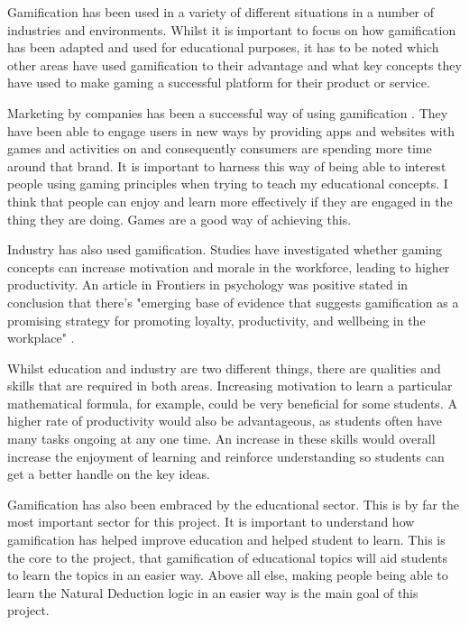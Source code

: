 \documentclass[a4paper]{article}
\begin{document}
Gamification has been used in a variety of different situations in a number of industries and environments. Whilst it is important to focus on how gamification has been adapted and used for educational purposes, it has to be noted which other areas have used gamification to their advantage and what key concepts they have used to make gaming a successful platform for their product or service.  

Marketing by companies has been a successful way of using gamification \cite{zichermann2011gamification}. They have been able to engage users in new ways by providing apps and websites with games and activities on and consequently consumers are spending more time around that brand. It is important to harness this way of being able to interest people using gaming principles when trying to teach my educational concepts. I think that people can enjoy and learn more effectively if they are engaged in the thing they are doing. Games are a good way of achieving this.

Industry has also used gamification. Studies have investigated whether gaming concepts can increase motivation and morale in the workforce, leading to higher productivity. An article in Frontiers in psychology was positive stated in conclusion that there's "emerging base of evidence that suggests gamification as a promising strategy for promoting loyalty, productivity, and wellbeing in the workplace" \cite{oprescu2014play}.

Whilst education and industry are two different things, there are qualities and skills that are required in both areas. Increasing motivation to learn a particular mathematical formula, for example, could be very beneficial for some students. A higher rate of productivity would also be advantageous, as students often have many tasks ongoing at any one time. An increase in these skills would overall increase the enjoyment of learning and reinforce understanding so students can get a better handle on the key ideas. 

Gamification has also been embraced by the educational sector. This is by far the most important sector for this project. It is important to understand how gamification has helped improve education and helped student to learn. This is the core to the project, that gamification of educational topics will aid students to learn the topics in an easier way. Above all else, making people being able to learn the Natural Deduction logic in an easier way is the main goal of this project.
\end{document}
